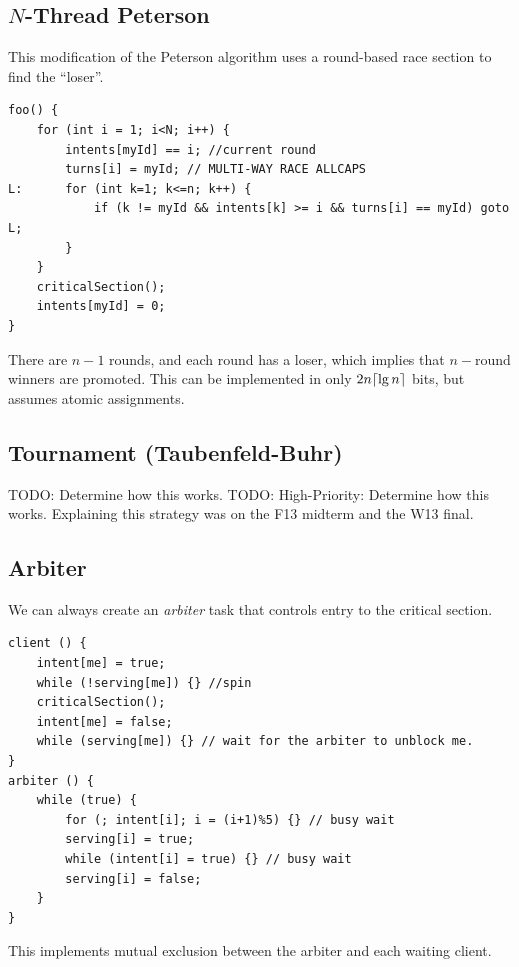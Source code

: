             \subsection{$N$-Thread Peterson} %
            \label{sub:n_thread_peterson}
                This modification of the Peterson algorithm uses a round-based race section to find the ``loser''.
                \begin{lstlisting}
foo() {
    for (int i = 1; i<N; i++) {
        intents[myId] == i; //current round
        turns[i] = myId; // MULTI-WAY RACE ALLCAPS
L:      for (int k=1; k<=n; k++) {
            if (k != myId && intents[k] >= i && turns[i] == myId) goto L;
        }
    }
    criticalSection();
    intents[myId] = 0;
}
                \end{lstlisting}
                There are $n-1$ rounds, and each round has a loser, which implies that $n - \text{round}$ winners are promoted.
                This can be implemented in only $2n\lceil\lg n\rceil$ bits, but assumes atomic assignments.
            \subsection{Tournament (Taubenfeld-Buhr)} %
            \label{sub:tournament_taubenfeld_buhr}
                TODO: Determine how this works.
                TODO: High-Priority: Determine how this works. Explaining this strategy was on the F13 midterm and the W13 final.
            \subsection{Arbiter} %
            \label{sub:arbiter}
                We can always create an \textit{arbiter} task that controls entry to the critical section.
                \begin{lstlisting}
client () {
    intent[me] = true;
    while (!serving[me]) {} //spin
    criticalSection();
    intent[me] = false;
    while (serving[me]) {} // wait for the arbiter to unblock me.
}
arbiter () {
    while (true) {
        for (; intent[i]; i = (i+1)%5) {} // busy wait
        serving[i] = true;
        while (intent[i] = true) {} // busy wait
        serving[i] = false;
    }
}
                \end{lstlisting}
                This implements mutual exclusion between the arbiter and each waiting client.
